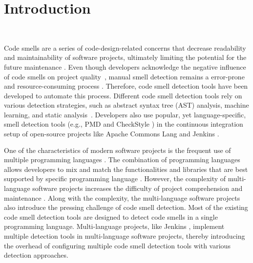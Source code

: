 \section{Introduction}~\label{sec:introduction}


Code smells are a series of code-design-related concerns that decrease
readability \cite{5741260} and maintainability \cite{6392174,6405287} of
software projects, ultimately limiting the potential for the future maintenance
\cite{Fowler_Beck}. Even though developers acknowledge the negative influence
of code smells on project quality~\cite{developersCare}, manual smell detection
remains a error-prone and resource-consuming process
\cite{DetectingDefectsInObject}. Therefore, code smell detection tools have
been developed to automate this process. Different code smell detection tools
rely on various detection strategies, such as abstract syntax tree (AST)
analysis, machine learning, and static analysis~\cite{ML}. Developers also use
popular, yet language-specific, smell detection tools (e.g., PMD \cite{PMD} and
CheckStyle \cite{CheckStyle}) in the continuous integration setup of
open-source projects like Apache Commons Lang \cite{ApacheCommonsLang} and
Jenkins \cite{Jekins}.


One of the characteristics of modern software projects is the frequent use of
multiple programming languages \cite{723183}. The combination of programming
languages allows developers to mix and match the functionalities and libraries
that are best supported by specific programming language \cite{7476675}.
However, the complexity of multi-language software projects increases the
difficulty of project comprehension and maintenance \cite{7476675,
10.1109/SCAM.2012.11, 7396422}. Along with the complexity, the multi-language
software projects also introduce the pressing challenge of code smell
detection. Most of the existing code smell detection tools are designed to
detect code smells in a single programming language. Multi-language projects,
like Jenkins \cite{Jekins}, implement multiple detection tools in
multi-language software projects, thereby introducing the overhead of
configuring multiple code smell detection tools with various detection
approaches.

